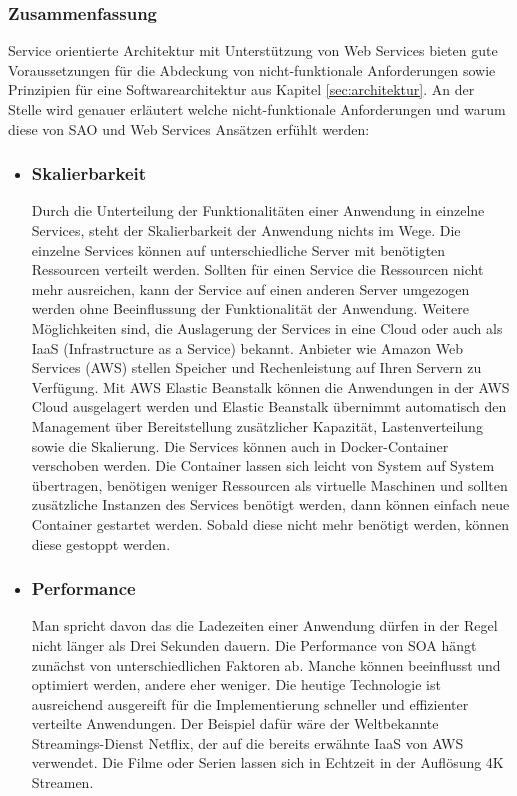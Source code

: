 \subsubsection{Zusammenfassung}
Service orientierte Architektur mit Unterstützung von Web Services bieten gute Voraussetzungen für die Abdeckung von nicht-funktionale Anforderungen sowie Prinzipien für eine Softwarearchitektur aus Kapitel \ref{sec:architektur}. An der Stelle wird genauer erläutert welche nicht-funktionale Anforderungen und warum diese von SAO und Web Services Ansätzen erfühlt werden:\\

\begin{itemize}
\item \subsubsection*{Skalierbarkeit} Durch die Unterteilung der Funktionalitäten einer Anwendung in einzelne Services, steht der Skalierbarkeit der Anwendung nichts im Wege. Die einzelne Services können auf unterschiedliche Server mit benötigten Ressourcen verteilt werden. Sollten für einen Service die Ressourcen nicht mehr ausreichen, kann der Service auf einen anderen Server umgezogen werden ohne Beeinflussung der Funktionalität der Anwendung. Weitere Möglichkeiten sind, die Auslagerung der Services in eine Cloud oder auch als IaaS (Infrastructure as a Service) bekannt. Anbieter wie Amazon Web Services (AWS) stellen Speicher und Rechenleistung auf Ihren Servern zu Verfügung. Mit AWS Elastic Beanstalk können die Anwendungen in der AWS Cloud ausgelagert werden und Elastic Beanstalk übernimmt automatisch den Management über Bereitstellung zusätzlicher Kapazität, Lastenverteilung sowie die Skalierung. 
Die Services können auch in Docker-Container verschoben werden. Die Container lassen sich leicht von System auf System übertragen, benötigen weniger Ressourcen als virtuelle Maschinen und sollten zusätzliche Instanzen des Services benötigt werden, dann können einfach neue Container gestartet werden. Sobald diese nicht mehr benötigt werden, können diese gestoppt werden.
\item \subsubsection*{Performance} Man spricht davon das die Ladezeiten einer Anwendung dürfen in der Regel nicht länger als Drei Sekunden dauern. Die Performance von SOA hängt zunächst von unterschiedlichen Faktoren ab. Manche können beeinflusst und optimiert werden, andere eher weniger. Die heutige Technologie ist ausreichend ausgereift für die Implementierung schneller und effizienter verteilte Anwendungen. Der Beispiel dafür wäre der Weltbekannte Streamings-Dienst Netflix, der auf die bereits erwähnte IaaS von AWS verwendet. Die Filme oder Serien lassen sich in Echtzeit in der Auflösung 4K Streamen. 

\end{itemize}
